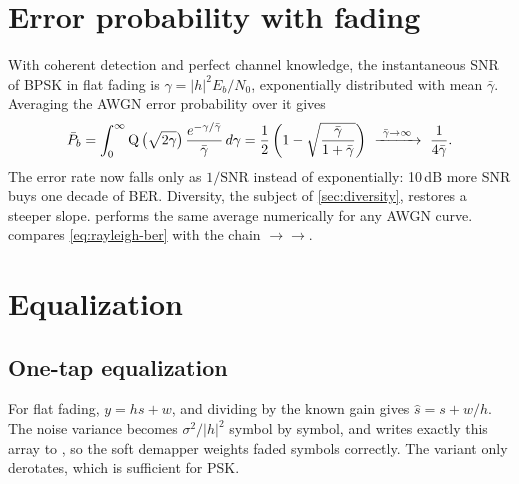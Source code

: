 \section{Error probability with fading}\label{sec:rayleigh-ber}
With coherent detection and perfect channel knowledge, the instantaneous SNR of BPSK in flat
fading is $\gamma=|h|^2E_b/N_0$, exponentially distributed with mean $\bar\gamma$. Averaging
the AWGN error probability over it gives
\begin{equation}
  \bar P_b=\int_0^\infty\Q\big(\sqrt{2\gamma}\big)\,\frac{e^{-\gamma/\bar\gamma}}{\bar\gamma}\,d\gamma
  =\frac12\left(1-\sqrt{\frac{\bar\gamma}{1+\bar\gamma}}\right)\ \xrightarrow{\ \bar\gamma\to\infty\ }\ \frac{1}{4\bar\gamma}.
  \label{eq:rayleigh-ber}
\end{equation}
The error rate now falls only as $1/\mathrm{SNR}$ instead of exponentially: 10\,dB more SNR
buys one decade of BER. Diversity, the subject of \cref{sec:diversity}, restores a steeper
slope.  performs the same average numerically for any AWGN curve.
 compares \cref{eq:rayleigh-ber} with the chain
$\to$$\to$.

\section{Equalization}\label{sec:equalization}
\subsection{One-tap equalization}
For flat fading, $y=hs+w$, and dividing by the known gain gives $\hat s=s+w/h$. The noise
variance becomes $\sigma^2/|h|^2$ symbol by symbol, and  writes exactly
this array to , so the soft demapper weights faded symbols correctly. The
 variant only derotates, which is sufficient for PSK.

